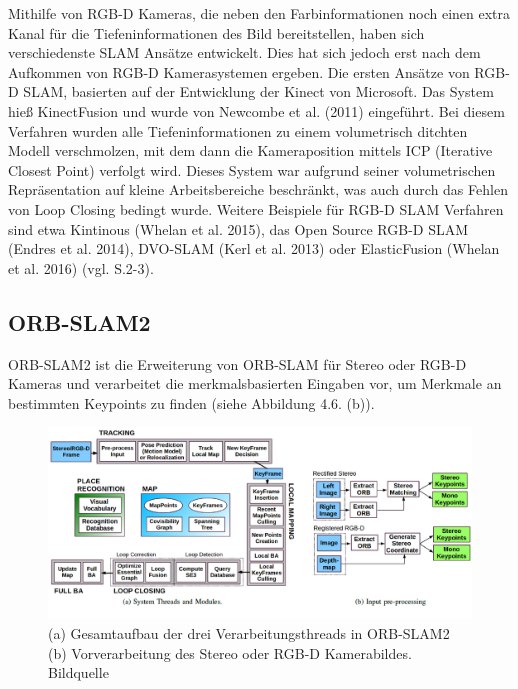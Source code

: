 Mithilfe von RGB-D Kameras, die neben den Farbinformationen noch einen extra Kanal für die Tiefeninformationen des Bild bereitstellen, haben sich verschiedenste SLAM Ansätze entwickelt. Dies hat sich jedoch erst nach dem Aufkommen von RGB-D Kamerasystemen ergeben. Die ersten Ansätze von RGB-D SLAM, basierten auf der Entwicklung der Kinect von Microsoft. Das System hieß KinectFusion und wurde von Newcombe et al. (2011) eingeführt. Bei diesem Verfahren wurden alle Tiefeninformationen zu einem volumetrisch ditchten Modell verschmolzen, mit dem dann die Kameraposition mittels ICP (Iterative Closest Point) verfolgt wird. Dieses System war aufgrund seiner volumetrischen Repräsentation auf kleine Arbeitsbereiche beschränkt, was auch durch das Fehlen von Loop Closing bedingt wurde. Weitere Beispiele für RGB-D SLAM Verfahren sind etwa \glqq Kintinous\grqq{} (Whelan et al. 2015), das Open Source RGB-D SLAM (Endres et al. 2014), \glqq DVO-SLAM\grqq{} (Kerl et al. 2013) oder \glqq ElasticFusion\grqq{} (Whelan et al. 2016) (vgl. \cite{orbslam2} S.2-3).

\subsection{ORB-SLAM2}

ORB-SLAM2 ist die Erweiterung von ORB-SLAM für Stereo oder RGB-D Kameras und verarbeitet die merkmalsbasierten Eingaben vor, um Merkmale an bestimmten Keypoints zu finden (siehe Abbildung 4.6. (b)).

\begin{figure}[H]
	\centering
	\includegraphics[scale=0.56]{orbslam2.png}
	\caption{(a) Gesamtaufbau der drei Verarbeitungsthreads in ORB-SLAM2 (b) Vorverarbeitung des Stereo oder RGB-D Kamerabildes. Bildquelle \cite{orbslam2}}
\end{figure}  

